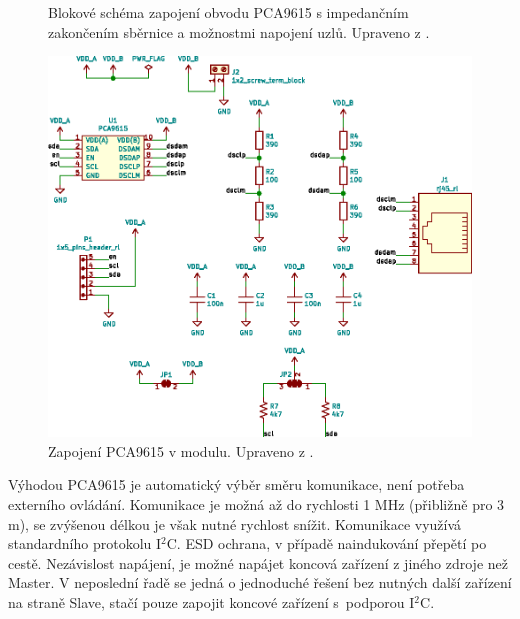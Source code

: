 \begin{figure}[H]
    \centering
    \def\svgwidth{\columnwidth}
    
    \caption[Blokové schéma zapojení obvodu PCA9615.]{Blokové schéma zapojení obvodu PCA9615 s impedančním zakončením sběrnice a možnostmi napojení uzlů. Upraveno z \cite{pca9615-schema-zapojeni}.}
    \label{fig:blokove-schema-pca9615-i2c-sbernice}
\end{figure}

\begin{figure}[H]
    \centering
    \includegraphics[width=\textwidth]{images/svg/kicad/zapojeni-pca9615-i2c-sbernice.eps}
    \caption[Zapojení PCA9615 v modulu.]{Zapojení PCA9615 v modulu. Upraveno z \cite{pca9615-schema-zapojeni}.}
    \label{fig:zapojeni-pca9615-i2c-sbernice}
\end{figure}

Výhodou PCA9615 je automatický výběr směru komunikace, není potřeba externího ovládání. Komunikace je možná až do rychlosti 1 MHz (přibližně pro 3 m), se zvýšenou délkou je však nutné rychlost snížit. Komunikace využívá standardního protokolu I$^2$C. ESD ochrana, v případě naindukování přepětí po cestě. Nezávislost napájení, je možné napájet koncová zařízení z jiného zdroje než Master. V neposlední řadě se jedná o jednoduché řešení bez nutných další zařízení na straně Slave, stačí pouze zapojit koncové zařízení s~podporou I$^2$C.

